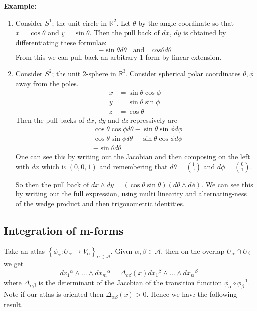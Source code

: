 \documentclass[11pt]{article}
\newcommand{\R}{\mathbb{R}}
\newenvironment{eg}
	{\begin{mdframed}[backgroundcolor=mylg,roundcorner=5pt,linewidth=0pt]\bfseries{Example:}\normalfont
	\setlength{\parindent}{0pt}}
	{\end{mdframed}}
\begin{document}
\begin{eg}
	\begin{enumerate}
		\item Consider $S^1$; the unit circle in $\R^2$.
			Let $\theta$ by the angle coordinate so that $x=\cos\theta$ and $y=\sin\theta$.
			Then the pull back of $dx$, $dy$ is obtained by differentiating these formulae:
			\[
				-\sin\theta d\theta \quad\text{and}\quad cos\theta d\theta
			\]
			From this we can pull back an arbitrary 1-form by linear extension.
		\item Consider $S^2$; the unit 2-sphere in $\R^3$.
			Consider spherical polar coordinates $\theta, \phi$ away from the poles.
			\begin{align*}
				x &= \sin\theta\cos\phi \\
				y &= \sin\theta\sin\phi \\
				z &= \cos\theta
			\end{align*}
			Then the pull backs of $dx$, $dy$ and $dz$ repressively are
			\begin{align*}
				&\cos\theta\cos\phi d\theta - \sin\theta\sin\phi d\phi\\
				&\cos\theta\sin\phi d\theta + \sin\theta\cos\phi d\phi \\
				& -\sin\theta d\theta
			\end{align*}
			One can see this by writing out the Jacobian and then composing on the left with $dx$ which is $(0 , 0, 1)$ and remembering that $d\theta=\binom{1}{0}$ and $d\phi=\binom{0}{1}$.

			So then the pull back of $dx \wedge dy = (\cos\theta\sin\theta)(d\theta \wedge d\phi)$.
			We can see this by writing out the full expression, using multi linearity and alternating-ness of the wedge product and then trigonometric identities.
	\end{enumerate}
\end{eg}

\subsection{Integration of m-forms}
Take an atlas $\left\{ \phi_\alpha: U_\alpha \to V_\alpha\right\}_{\alpha\in\mathcal{A}}$.
Given $\alpha, \beta\in\mathcal{A}$, then on the overlap $U_\alpha \cap U_\beta$ we get
\[
	d{x_1}^\alpha \wedge \dots \wedge d{x_m}^\alpha = \Delta_{\alpha\beta}(x) d{x_1}^\beta \wedge \dots \wedge d{x_m}^\beta
\]
where $\Delta_{\alpha\beta}$ is the determinant of the Jacobian of the transition function $\phi_\alpha \circ \phi_\beta^{-1}$.
Note if our atlas is oriented then $\Delta_{\alpha\beta}(x) > 0$.
Hence we have the following result.
\end{document}
